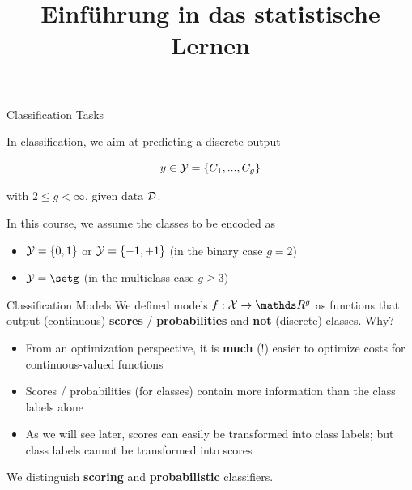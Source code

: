 \documentclass[11pt,compress,t,notes=noshow, xcolor=table]{beamer}
\title{Einführung in das statistische Lernen}
\institute{\href{https://compstat-lmu.github.io/lecture_i2ml/}{compstat-lmu.github.io/lecture\_i2ml}}
\date{}
\begin{document}
















\begin{vbframe}{Classification Tasks}

In classification, we aim at predicting a discrete output

$$
y \in \mathcal{Y} = \{C_1, ..., C_g\}
$$

with $2 \le g < \infty$, given data $\mathcal{D}$.

\lz

In this course, we assume the classes to be encoded as

\begin{itemize}
  \item $\mathcal{Y} = \{0, 1\}$ or $\mathcal{Y} = \{-1, +1\}$ (in the binary case $g = 2$)
  \item $\Yspace = \setg$  (in the multiclass case $g \ge 3$)
\end{itemize}

\vfill


\end{vbframe}


\begin{vbframe}{Classification Models}
We defined models $f: \Xspace \to \R^g$ as functions that output (continuous) \textbf{scores} / \textbf{probabilities} and \textbf{not} (discrete) classes. Why?

\begin{itemize}
  \item From an optimization perspective, it is \textbf{much} (!) easier to optimize costs for continuous-valued functions
  \item Scores / probabilities (for classes) contain more information than the class labels alone
  \item As we will see later, scores can easily be transformed into class labels; but class labels cannot be transformed into scores
\end{itemize}

We distinguish \textbf{scoring} and \textbf{probabilistic} classifiers.
\end{vbframe}
\end{document}
